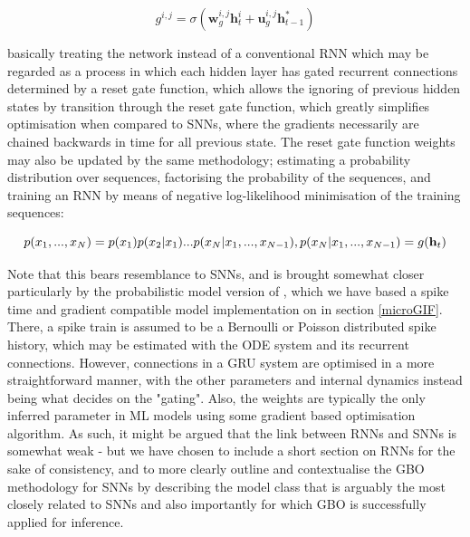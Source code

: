 \documentclass[mphil,deptreport,ianc]{infthesis} %
\begin{document}
\begin{equation}
    g^{i,j} = \sigma ( \textbf{w}_g^{i,j}\textbf{h}_t^{i} + \textbf{u}_g^{i,j}\textbf{h}_{t-1}^{*})
\end{equation}

basically treating the network instead of a conventional RNN which may be regarded as a process in which each hidden layer has gated recurrent connections determined by a reset gate function, which allows the ignoring of previous hidden states by transition through the reset gate function, which greatly simplifies optimisation when compared to SNNs, where the gradients necessarily are chained backwards in time for all previous state.
The reset gate function weights may also be updated by the same methodology;
estimating a probability distribution over sequences, factorising the probability of the sequences, and training an RNN by means of negative log-likelihood minimisation of the training sequences:

\begin{equation}
    p(x_1, ..., x_N) = p(x_1)p(x_2|x_1) ... p(x_N|x_1,...,x_{N-1}), \\
    p(x_N|x_1,...,x_{N-1}) = g(\textbf{h}_t)
\end{equation}

Note that this bears resemblance to SNNs, and is brought somewhat closer particularly by the probabilistic model version of \cite{Rene2020}, which we have based a spike time and gradient compatible model implementation on in section \ref{microGIF}.
There, a spike train is assumed to be a Bernoulli or Poisson distributed spike history, which may be estimated with the ODE system and its recurrent connections.
However, connections in a GRU \cite{Chung2015a} system are optimised in a more straightforward manner, with the other parameters and internal dynamics instead being what decides on the "gating".
Also, the weights are typically the only inferred parameter in ML models using some gradient based optimisation algorithm. 
As such, it might be argued that the link between RNNs and SNNs is somewhat weak - but we have chosen to include a short section on RNNs for the sake of consistency, and to more clearly outline and contextualise the GBO methodology for SNNs by describing the model class that is arguably the most closely related to SNNs and also importantly for which GBO is successfully applied for inference.
\end{document}
